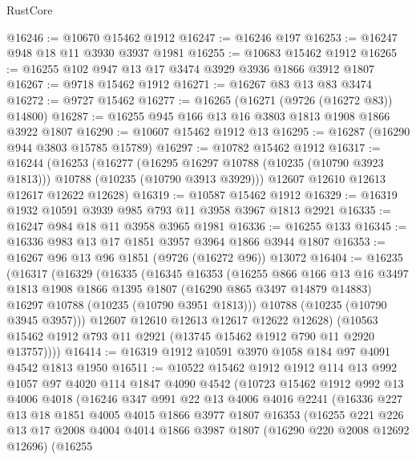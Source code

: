 \begin{lexlean}{RustCore}
\begin{coremodule}
@16246 := @10670 @15462 @1912
@16247 := @16246 @197
@16253 := @16247 @948 @18 @11 @3930 @3937 @1981
@16255 := @10683 @15462 @1912
@16265 := @16255 @102 @947 @13 @17 @3474 @3929 @3936 @1866 @3912 @1807
@16267 := @9718 @15462 @1912
@16271 := @16267 @83 @13 @83 @3474
@16272 := @9727 @15462
@16277 := @16265 (@16271 (@9726 (@16272 @83)) @14800)
@16287 := @16255 @945 @166 @13 @16 @3803 @1813 @1908 @1866 @3922 @1807
@16290 := @10607 @15462 @1912 @13
@16295 := @16287 (@16290 @944 @3803 @15785 @15789)
@16297 := @10782 @15462 @1912
@16317 := @16244
    (@16253
      (@16277
        (@16295 @16297 @10788 (@10235 (@10790 @3923 @1813)))
        @10788
        (@10235 (@10790 @3913 @3929)))
      @12607
      @12610
      @12613
      @12617
      @12622
      @12628)
@16319 := @10587 @15462 @1912
@16329 := @16319 @1932 @10591 @3939 @985 @793 @11 @3958 @3967 @1813 @2921
@16335 := @16247 @984 @18 @11 @3958 @3965 @1981
@16336 := @16255 @133
@16345 := @16336 @983 @13 @17 @1851 @3957 @3964 @1866 @3944 @1807
@16353 := @16267 @96 @13 @96 @1851 (@9726 (@16272 @96)) @13072
@16404 := @16235
    (@16317
      (@16329
        (@16335
          (@16345
            @16353
            (@16255
              @866
              @166
              @13
              @16
              @3497
              @1813
              @1908
              @1866
              @1395
              @1807
              (@16290 @865 @3497 @14879 @14883)
              @16297
              @10788
              (@10235 (@10790 @3951 @1813)))
            @10788
            (@10235 (@10790 @3945 @3957)))
          @12607
          @12610
          @12613
          @12617
          @12622
          @12628)
        (@10563 @15462 @1912 @793 @11 @2921 (@13745 @15462 @1912 @790 @11 @2920 @13757))))
@16414 := @16319 @1912 @10591 @3970 @1058 @184 @97 @4091 @4542 @1813 @1950
@16511 := @10522
    @15462
    @1912
    @1912
    @114
    @13
    @992
    @1057
    @97
    @4020
    @114
    @1847
    @4090
    @4542
    (@10723
      @15462
      @1912
      @992
      @13
      @4006
      @4018
      (@16246
        @347
        @991
        @22
        @13
        @4006
        @4016
        @2241
        (@16336
          @227
          @13
          @18
          @1851
          @4005
          @4015
          @1866
          @3977
          @1807
          @16353
          (@16255
            @221
            @226
            @13
            @17
            @2008
            @4004
            @4014
            @1866
            @3987
            @1807
            (@16290 @220 @2008 @12692 @12696)
            (@16255

\end{coremodule}
\end{lexlean}
